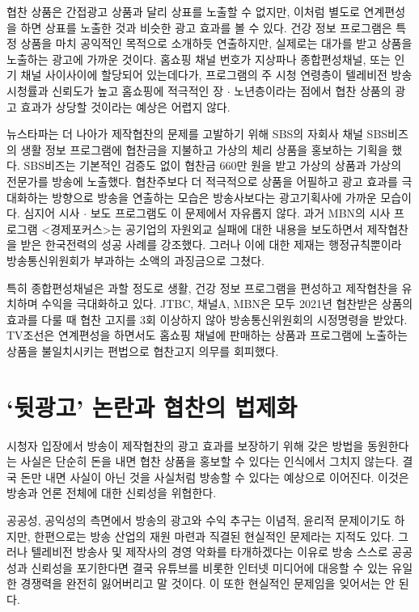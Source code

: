 협찬 상품은 간접광고 상품과 달리 상표를 노출할 수 없지만, 이처럼 별도로 연계편성을 하면 상표를 노출한 것과 비슷한 광고 효과를 볼 수 있다. 건강 정보 프로그램은 특정 상품을 마치 공익적인 목적으로 소개하듯 연출하지만, 실제로는 대가를 받고 상품을 노출하는 광고에 가까운 것이다. 홈쇼핑 채널 번호가 지상파나 종합편성채널, 또는 인기 채널 사이사이에 할당되어 있는데다가, 프로그램의 주 시청 연령층이 텔레비전 방송 시청률과 신뢰도가 높고\cite{kpf2021} 홈쇼핑에 적극적인 장 $\cdot$ 노년층이라는 점에서 협찬 상품의 광고 효과가 상당할 것이라는 예상은 어렵지 않다.

뉴스타파는 더 나아가 제작협찬의 문제를 고발하기 위해 SBS의 자회사 채널 SBS비즈의 생활 정보 프로그램에 협찬금을 지불하고 가상의 체리 상품을 홍보하는 기획을 했다\cite{newstapa2021}. SBS비즈는 기본적인 검증도 없이 협찬금 660만 원을 받고 가상의 상품과 가상의 전문가를 방송에 노출했다. 협찬주보다 더 적극적으로 상품을 어필하고 광고 효과를 극대화하는 방향으로 방송을 연출하는 모습은 방송사보다는 광고기획사에 가까운 모습이다. 심지어 시사 $\cdot$ 보도 프로그램도 이 문제에서 자유롭지 않다. 과거 MBN의 시사 프로그램 <경제포커스>는 공기업의 자원외교 실패에 대한 내용을 보도하면서 제작협찬을 받은 한국전력의 성공 사례를 강조했다. 그러나 이에 대한 제재는 행정규칙뿐이라 방송통신위원회가 부과하는 소액의 과징금으로 그쳤다\cite{mediatoday2015}.

특히 종합편성채널은 과할 정도로 생활, 건강 정보 프로그램을 편성하고 제작협찬을 유치하며 수익을 극대화하고 있다. JTBC, 채널A, MBN은 모두 2021년 협찬받은 상품의 효과를 다룰 때 협찬 고지를 3회 이상하지 않아 방송통신위원회의 시정명령을 받았다. TV조선은 연계편성을 하면서도 홈쇼핑 채널에 판매하는 상품과 프로그램에 노출하는 상품을 불일치시키는 편법으로 협찬고지 의무를 회피했다\cite{mediaus2021}.

\section*{`뒷광고' 논란과 협찬의 법제화}


시청자 입장에서 방송이 제작협찬의 광고 효과를 보장하기 위해 갖은 방법을 동원한다는 사실은 단순히 돈을 내면 협찬 상품을 홍보할 수 있다는 인식에서 그치지 않는다. 결국 돈만 내면 사실이 아닌 것을 사실처럼 방송할 수 있다는 예상으로 이어진다. 이것은 방송과 언론 전체에 대한 신뢰성을 위협한다.

공공성, 공익성의 측면에서 방송의 광고와 수익 추구는 이념적, 윤리적 문제이기도 하지만, 한편으로는 방송 산업의 재원 마련과 직결된 현실적인 문제라는 지적도 있다. 그러나 텔레비전 방송사 및 제작사의 경영 악화를 타개하겠다는 이유로 방송 스스로 공공성과 신뢰성을 포기한다면 결국 유튜브를 비롯한 인터넷 미디어에 대응할 수 있는 유일한 경쟁력을 완전히 잃어버리고 말 것이다. 이 또한 현실적인 문제임을 잊어서는 안 된다.

